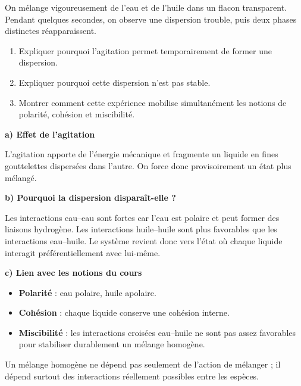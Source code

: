 \documentclass[11pt,a4paper]{article}
\begin{document}
\begin{enoncebox}
On mélange vigoureusement de l'eau et de l'huile dans un flacon transparent.  
Pendant quelques secondes, on observe une dispersion trouble, puis deux phases distinctes réapparaissent.

\begin{enumerate}[label=\arabic*)]
    \item Expliquer pourquoi l'agitation permet temporairement de former une dispersion.
    \item Expliquer pourquoi cette dispersion n'est pas stable.
    \item Montrer comment cette expérience mobilise simultanément les notions de polarité, cohésion et miscibilité.
\end{enumerate}
\end{enoncebox}

\begin{corrigebox}
\textbf{a) Effet de l'agitation}

L'agitation apporte de l'énergie mécanique et fragmente un liquide en fines gouttelettes dispersées dans l'autre.  
On force donc provisoirement un état plus mélangé.

\textbf{b) Pourquoi la dispersion disparaît-elle ?}

Les interactions eau--eau sont fortes car l'eau est polaire et peut former des liaisons hydrogène.  
Les interactions huile--huile sont plus favorables que les interactions eau--huile.  
Le système revient donc vers l'état où chaque liquide interagit préférentiellement avec lui-même.

\textbf{c) Lien avec les notions du cours}

\begin{itemize}
    \item \textbf{Polarité} : eau polaire, huile apolaire.
    \item \textbf{Cohésion} : chaque liquide conserve une cohésion interne.
    \item \textbf{Miscibilité} : les interactions croisées eau--huile ne sont pas assez favorables pour stabiliser durablement un mélange homogène.
\end{itemize}

\begin{bilanbox}
Un mélange homogène ne dépend pas seulement de l'action de mélanger ; il dépend surtout des interactions réellement possibles entre les espèces.
\end{bilanbox}
\end{corrigebox}
\end{document}
